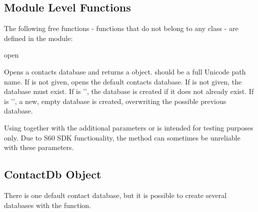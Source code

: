 \subsection{Module Level Functions}
\label{subsec:contmod}

The following free functions - functions that do not belong to any class 
- are defined in the  module:

\begin{funcdesc}{open}{}

Opens a contacts database and returns a  object.  
should be a full Unicode path name. If  is not given, opens the 
default contacts database. If  is not given, the database must exist. 
If  is '', the database is created if it does not already 
exist. If  is '', a new, empty database is created, 
overwriting the possible previous database.

\end{funcdesc}

\begin{notice}[warning]
Using  together with the additional parameters  
or  is intended for testing purposes only. Due to S60 SDK 
functionality, the  method can sometimes be unreliable with these 
parameters. 
\end{notice}

\subsection{ContactDb Object}
\label{subsec:contactdb}

There is one default contact database, but it is possible to create several 
databases with the  function.

